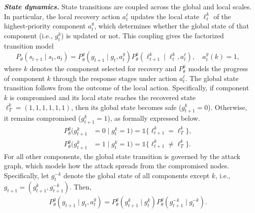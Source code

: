 \documentclass[sigconf]{acmart}
\begin{document}
\vspace{2.5mm}
\noindent\textit{\textbf{State dynamics.}} State transitions are coupled across the global and local scales. In particular, the local recovery action $a_t^{\ell}$ updates the local state  $\ell_t^k$ of the highest-priority component $a_t^g$, which determines whether the global state of that component (i.e., $g^k_t$) is updated or not. This coupling gives the factorized transition model
\begin{equation*}
    P_\theta(s_{t+1}\mid s_t, a_t)=P^g_\theta(g_{t+1}\mid g_t, a^g_t)P_\theta^k(\ell^k_{t+1}\mid \ell^k_t, a^\ell_t), \quad  a_t^g(k)=1, 
\end{equation*}
where $k$ denotes the component selected for recovery and $P_{\theta}^k$ models the progress of component $k$ through the response stages under action $a_t^{\ell}$. The global state transition follows from the outcome of the local action. Specifically, if component $k$ is compromised and its local state reaches the recovered state $\ell^k_T = (1,1,1,1,1,1)$, then its global state becomes safe ($g^k_{t+1}=0$). Otherwise, it remains compromised ($g^k_{t+1}=1$), as formally expressed below.
\begin{align*}
P_{\theta}^g(g^k_{t+1} &= 0 \mid g^k_t = 1) = \mathds{1}\{\ell_{t+1}^{k} = \ell^k_T\},\\
P_{\theta}^g(g^k_{t+1} &= 1 \mid g^k_t = 1) = \mathds{1}\{\ell_{t+1}^{k} \neq \ell^k_T\}.
\end{align*}
For all other components, the global state transition is governed by the attack graph, which models how the attack spreads from the compromised nodes. Specifically, let $g^{-k}_t$ denote the global state of all components except $k$, i.e., $g_{t+1}=(g^k_{t+1}, g^{-k}_{t+1})$. Then, 
\begin{align*}
P_{\theta}^g(g_{t+1} \mid g_t, a^g_t) = P_{\theta}^{g}(g^k_{t+1} \mid g^k_t)P_{\theta}^{g}(g_{t+1}^{-k} \mid g^{-k}_t).
\end{align*}  
\end{document}
